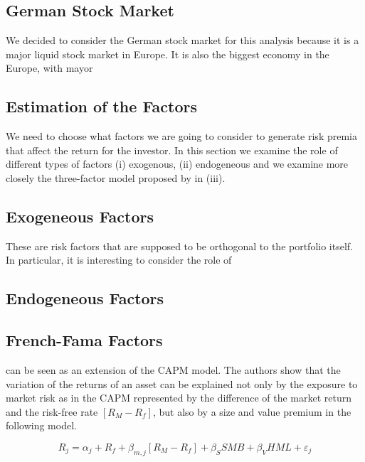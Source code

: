 \documentclass[hidelinks,11pts]{article}
\DeclareMathOperator{\1}{\mathbbm{1}}
\begin{document}
    \subsection{German Stock Market}
We decided to consider the German stock market for this analysis because it is a major liquid stock market in Europe. It is also the biggest economy in the Europe, with mayor 





    \subsection{Estimation of the Factors}

We need to choose what factors we are going to consider to generate risk premia that affect the return for the investor. In this section we examine the role of different types of factors (i) exogenous, (ii) endogeneous and we examine more closely the three-factor model proposed by \cite{famaCommonRiskFactors1993} in (iii).



        \subsection{Exogeneous Factors}
These are risk factors that are supposed to be orthogonal to the portfolio itself. 
In particular, it is interesting to consider the role of 



        \subsection{Endogeneous Factors}





        \subsection{French-Fama Factors}

\cite{famaCommonRiskFactors1993} can be seen as an extension of the CAPM model. 
The authors show that the variation of the returns of an asset can be explained not only by the exposure to market risk as in the CAPM represented by the difference of the market return and the risk-free rate $[R_M-R_f]$, but also by a size and value premium in the following model.
    
    \begin{equation}
        R_j = \alpha_j + R_f + \beta_{m,j}[R_M-R_f] +\beta_{S} SMB + \beta_{V}HML +\varepsilon_j
    \end{equation}
\end{document}
